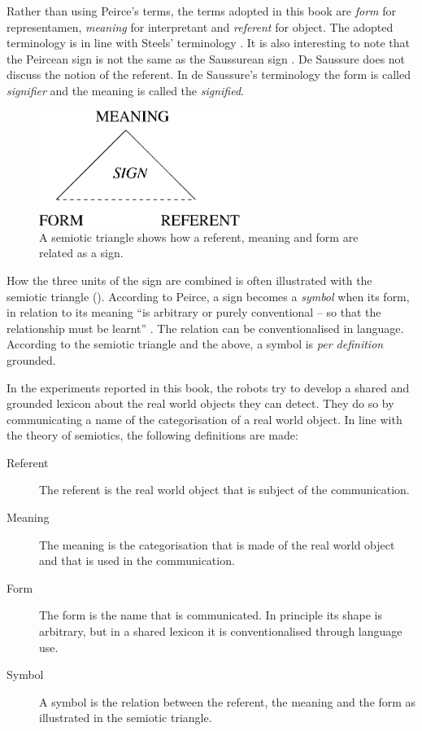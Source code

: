 

Rather than using Peirce's terms, the terms adopted in this book are {\em form} for representamen, {\em meaning} for interpretant and {\em referent} for object. The adopted terminology is in line with Steels' terminology \citep{steels:2000}. It is also interesting to note that the Peircean sign is not the same as the Saussurean sign \citep{saussure:1974}. De Saussure does not discuss the notion of the referent. In de Saussure's terminology the form is called {\em signifier} and the meaning is called the {\em signified}.


\begin{figure}
\centerline{\includegraphics[width=6.6cm]{introduction/semiotic3.eps}}
\caption{A semiotic triangle shows how a referent, meaning and form are related as a sign.}
\label{f:intro:semiotic}
\end{figure}

How the three units of the sign are combined is often illustrated with the semiotic triangle (). According to Peirce, a sign becomes a {\em symbol} when its form, in relation to its meaning ``is arbitrary or purely conventional -- so that the relationship must be learnt'' \citep{chandler:1994}. The relation can be conventionalised in language. According to the semiotic triangle and the above, a symbol is {\em per definition} grounded.

In the experiments reported in this book, the robots try to develop a shared and grounded lexicon about the real world objects they can detect. They do so by communicating a name of the categorisation of a real world object. In line with the theory of semiotics, the following definitions are made:

\begin{description}

\item[Referent] The referent is the real world object that is subject of the communication.

\item[Meaning] The meaning is the categorisation that is made of the real world object and that is used in the communication.

\item[Form] The form is the name that is communicated. In principle its shape is arbitrary, but in a shared lexicon it is conventionalised through language use.

\item[Symbol] A symbol is the relation between the referent, the meaning and the form as illustrated in the semiotic triangle.

\end{description}



